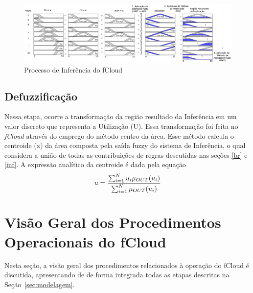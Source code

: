 \documentclass[tcc,capa]{texufpel}
\begin{document}
\begin{figure}[h]
\centering
\includegraphics[scale=0.23]{images/InferenciaModelagemFuzzIeee2019PtBr.png}
\caption{Processo de Inferência do fCloud}
\label{fig:infe2}
\end{figure}

\subsection{Defuzzificação}

Nessa etapa, ocorre a transformação da região resultado da Inferência em um valor discreto que representa a Utilização (U). Essa transformação foi feita no \emph{fCloud} através do emprego do método centro da área. Esse método calcula o centroide (x) da área composta pela saída fuzzy do sistema de Inferência, o qual considera a união de todas as contribuições de regras descutidas nas seções \ref{br} e \ref{inf}. A expressão analítico da centroide é dada pela equação
\begin{equation} \label{lblEqCentroideSF2}
  u=  \frac{ \sum _{i=1} ^N u_i \mu_{OUT}(u_i) }{  \sum _{i=1} ^N \mu_{OUT}(u_i)  } \\
\end{equation}

\newpage

\section{Visão Geral dos Procedimentos Operacionais do fCloud}

Nesta seção, a visão geral dos procedimentos relacionados à operação do fCloud é discutida, apresentando de  de forma integrada todas as etapas descritas na Seção~\ref{sec:modelagem}.
\end{document}
